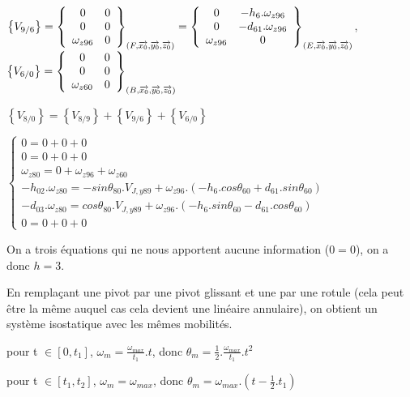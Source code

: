 $\left\{V_{9/6}\right\}=\left\{\begin{array}{c c}0 & 0 \\ 0 & 0 \\ \omega_{z96} & 0\end{array}\right\}_{(F,\overrightarrow{x_0},\overrightarrow{y_0},\overrightarrow{z_0})}=\left\{\begin{array}{c c}0 & -h_6.\omega_{z96} \\ 0 & -d_{61}.\omega_{z96} \\ \omega_{z96} & 0\end{array}\right\}_{(E,\overrightarrow{x_0},\overrightarrow{y_0},\overrightarrow{z_0})}$, 
$\left\{V_{6/0}\right\}=\left\{\begin{array}{c c}0 & 0 \\ 0 & 0 \\ \omega_{z60} & 0\end{array}\right\}_{(B,\overrightarrow{x_0},\overrightarrow{y_0},\overrightarrow{z_0})}$

\cor

$\left\{V_{8/0}\right\}=\left\{V_{8/9}\right\}+\left\{V_{9/6}\right\}+\left\{V_{6/0}\right\}$

$\left\{\begin{array}{l}
0=0+0+0 \\
0=0+0+0 \\
\omega_{z80}=0+\omega_{z96}+\omega_{z60} \\
-h_{02}.\omega_{z80}=-sin\theta_{80}.V_{J,y89}+\omega_{z96}.(-h_6.cos\theta_{60}+d_{61}.sin\theta_{60}) \\
-d_{03}.\omega_{z80}=cos\theta_{80}.V_{J,y89}+\omega_{z96}.(-h_6.sin\theta_{60}-d_{61}.cos\theta_{60}) \\
0=0+0+0
\end{array}\right.$

\cor

On a trois équations qui ne nous apportent aucune information ($0=0$), on a donc $h=3$.

\cor

En remplaçant une pivot par une pivot glissant et une par une rotule (cela peut être la même auquel cas cela devient une linéaire annulaire), on obtient un système isostatique avec les mêmes mobilités.

\cor


pour t $\in[0,t_1]$, $\omega_m=\frac{\omega_{max}}{t_1}.t$, donc 
$\theta_m=\frac{1}{2}.\frac{\omega_{max}}{t_1}.t^2$

pour t $\in[t_1,t_2]$, $\omega_m=\omega_{max}$, donc 
$\theta_m=\omega_{max}.\left(t-\frac{1}{2}.t_1\right)$

